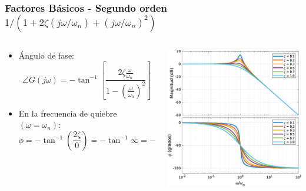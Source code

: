 \documentclass[aspectratio=169]{beamer}
\theoremstyle{definition}
\theoremstyle{plain}
\theoremstyle{remark}
\begin{document}
\begin{frame}[<+->]\frametitle{Factores Básicos - Segundo orden $1/(1+2\zeta(j\omega/\omega_n)+(j\omega/\omega_n)^2)$}
\vspace*{7mm}
\begin{columns}
	\begin{column}{0.5\textwidth}
	\begin{itemize}
		\item Ángulo de fase:
		\begin{equation*}
			\angle G(j\omega) = -\tan^{-1} \left[\frac{2\zeta\frac{\omega}{\omega_n}}{1-\left(\frac{\omega}{\omega_n}\right)^2} \right]
		\end{equation*}
		\item En la frecuencia de quiebre $(\omega = \omega_n)$:
		\begin{equation*}
			\phi = -\tan^{-1}\left(\frac{2\zeta}{0}\right) = -\tan^{-1}\infty = -\ang{90}
		\end{equation*}
	\end{itemize}
	\end{column}
	\begin{column}{0.5\textwidth}
	\centering
	\includegraphics[width=6.5cm]{images/bodeSecondOrderIntegral.eps}
	\end{column}
\end{columns}
\end{frame}
\end{document}
